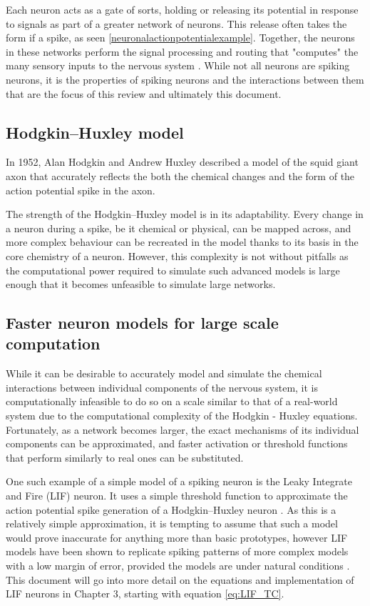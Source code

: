 Each neuron acts as a gate of sorts, holding or releasing its potential in
response to signals as part of a greater network of neurons. This release often
takes the form if a spike, as seen \ref{neuronalactionpotentialexample}.
Together, the neurons in these networks perform the signal processing and
routing that "computes" the many sensory inputs to the nervous system
\autocite{koch_biophysics_2004}. While not all neurons are spiking neurons, it
is the properties of spiking neurons and the interactions between them that are
the focus of this review and ultimately this document.

\subsection{Hodgkin–Huxley model}

In 1952, Alan Hodgkin and Andrew Huxley described a model of the squid giant
axon that accurately reflects the both the chemical changes and the form of the
action potential spike in the axon. \autocite{hodgkin_quantitative_1952}

The strength of the Hodgkin–Huxley model is in its adaptability. Every change in
a neuron during a spike, be it chemical or physical, can be mapped across, and
more complex behaviour can be recreated in the model thanks to its basis in the
core chemistry of a neuron. However, this complexity is not without pitfalls as
the computational power required to simulate such advanced models is large
enough that it becomes unfeasible to simulate large networks.

\subsection{Faster neuron models for large scale computation}

While it can be desirable to accurately model and simulate the chemical
interactions between individual components of the nervous system, it is
computationally infeasible to do so on a scale similar to that of a real-world
system due to the computational complexity of the Hodgkin - Huxley equations.
Fortunately, as a network becomes larger, the exact mechanisms of its individual
components can be approximated, and faster activation or threshold functions
that perform similarly to real ones can be substituted.

One such example of a simple model of a spiking neuron is the Leaky Integrate
and Fire (LIF) neuron. It uses a simple threshold function to approximate the
action potential spike generation of a Hodgkin–Huxley neuron
\autocite{trappenberg_fundamentals_2009}. As this is a relatively simple
approximation, it is tempting to assume that such a model would prove inaccurate
for anything more than basic prototypes, however LIF models have been shown to
replicate spiking patterns of more complex models with a low margin of error,
provided the models are under natural conditions
\autocite{teeter_generalized_2018}. This document will go into more detail on
the equations and implementation of LIF neurons in Chapter 3, starting with
equation \eqref{eq:LIF_TC}.